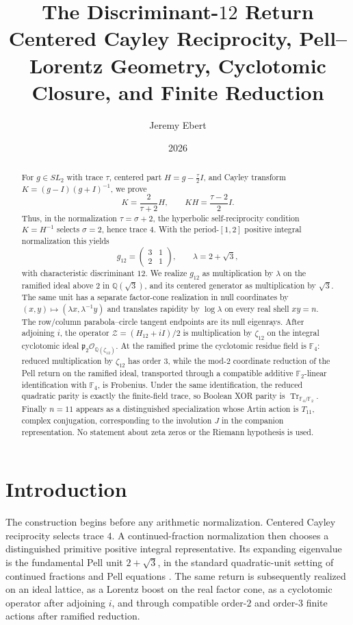\documentclass[11pt]{article}
\title{\textbf{The Discriminant-$12$ Return}\\
\large Centered Cayley Reciprocity, Pell--Lorentz Geometry, Cyclotomic Closure, and Finite Reduction}
\author{Jeremy Ebert}
\date{2026}
\theoremstyle{remark}
\newcommand{\Q}{\mathbb Q}
\newcommand{\F}{\mathbb F}
\newcommand{\OO}{\mathcal O}
\newcommand{\Tr}{\operatorname{Tr}}
\begin{document}
\maketitle

\begin{abstract}
For $g\in SL_2$ with trace $\tau$, centered part
$H=g-\tfrac{\tau}{2}I$, and Cayley transform
$K=(g-I)(g+I)^{-1}$, we prove
\[
K=\frac{2}{\tau+2}H,
\qquad
KH=\frac{\tau-2}{2}I.
\]
Thus, in the normalization $\tau=\sigma+2$, the hyperbolic self-reciprocity
condition $K=H^{-1}$ selects $\sigma=2$, hence trace $4$.  With the
period-$[1,2]$ positive integral normalization this yields
\[
g_{12}=\begin{pmatrix}3&1\\2&1\end{pmatrix},
\qquad
\lambda=2+\sqrt3,
\]
with characteristic discriminant $12$.  We realize $g_{12}$ as multiplication
by $\lambda$ on the ramified ideal above $2$ in $\Q(\sqrt3)$, and its centered
generator as multiplication by $\sqrt3$.  The same unit has a separate
factor-cone realization in null coordinates by
$(x,y)\mapsto(\lambda x,\lambda^{-1}y)$ and translates rapidity by
$\log\lambda$ on every real shell $xy=n$.  The row/column parabola--circle
tangent endpoints are its null eigenrays.  After adjoining $i$, the operator
$\mathcal Z=(H_{12}+iI)/2$ is multiplication by $\zeta_{12}$ on the integral
cyclotomic ideal $\mathfrak p_2\OO_{\Q(\zeta_{12})}$.  At the ramified prime
the cyclotomic residue field is $\F_4$: reduced multiplication by
$\zeta_{12}$ has order $3$, while the mod-$2$ coordinate reduction of the Pell
return on the ramified ideal, transported through a compatible additive
$\F_2$-linear identification with $\F_4$, is Frobenius.  Under the same
identification, the reduced quadratic parity is exactly the finite-field
trace, so Boolean XOR parity is $\Tr_{\F_4/\F_2}$.  Finally $n=11$ appears as
a distinguished specialization whose Artin action is $T_{11}$, complex
conjugation, corresponding to the involution $J$ in the companion
representation.  No statement about zeta zeros or the Riemann hypothesis is
used.
\end{abstract}

\section{Introduction}

The construction begins before any arithmetic normalization.  Centered Cayley
reciprocity selects trace $4$.  A continued-fraction normalization then
chooses a distinguished primitive positive integral representative.  Its
expanding eigenvalue is the fundamental Pell unit $2+\sqrt3$, in the standard
quadratic-unit setting of continued fractions and Pell equations
\cite{HardyWright,Serre}.  The same return is subsequently realized on an
ideal lattice, as a Lorentz boost on the real factor cone, as a cyclotomic
operator after adjoining $i$, and through compatible order-$2$ and order-$3$
finite actions after ramified reduction.
\end{document}
